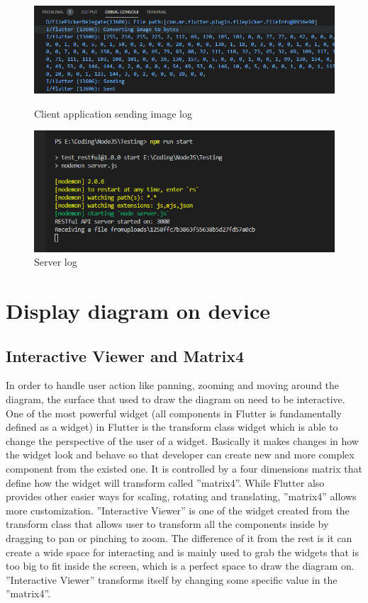 \begin{figure}[!b]
\centering
\includegraphics[width=14cm]{Images/App/ImageSendClient.png}
\caption{Client application sending image log}
\label{fig:ImageSendClient}

\centering
\includegraphics[width=14cm]{Images/App/ImageSendServer.png}
\caption{Server log}
\label{fig:ImageSendServer}
\end{figure}

\section{Display diagram on device}
\subsection{Interactive Viewer and Matrix4}
In order to handle user action like panning, zooming and moving around the diagram, the surface that used to draw the diagram on need to be interactive. One of the most powerful widget (all components in Flutter is fundamentally defined as a widget) in Flutter is the transform class widget which is able to change the perspective of the user of a widget. Basically it makes changes in how the widget look and behave so that developer can create new and more complex component from the existed one. It is controlled by a four dimensions matrix that define how the widget will transform called ''matrix4''. While Flutter also provides other easier ways for scaling, rotating and translating, ''matrix4'' allows more customization. ''Interactive Viewer'' is one of the widget created from the transform class that allows user to transform all the components inside by dragging to pan or pinching to zoom. The difference of it from the rest is it can create a wide space for interacting and is mainly used to grab the widgets that is too big to fit inside the screen, which is a perfect space to draw the diagram on. ''Interactive Viewer'' transforms itself by changing some specific value in the ''matrix4''.

